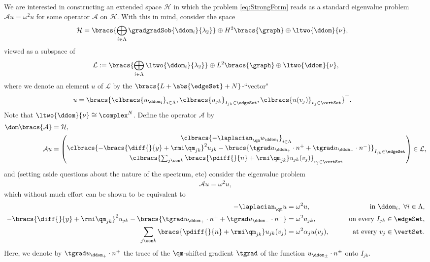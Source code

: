 \documentclass[11pt]{report}
\newcommand{\aop}{\mathcal{A}}
\newcommand{\hcal}{\mathcal{H}}
\newcommand{\lcal}{\mathcal{L}}
\begin{document}
We are interested in constructing an extended space $\hcal$ in which the problem \eqref{eq:StrongForm} reads as a standard eigenvalue problem $\aop u = \omega^2 u$ for some operator $\aop$ on $\hcal$.
With this in mind, consider the space
\begin{align*}
	\hcal &= \bracs{\bigoplus_{i\in\Lambda}\gradgradSob{\ddom_i}{\lambda_2}} \oplus H^2\bracs{\graph} \oplus \ltwo{\ddom}{\nu},
\end{align*}
viewed as a subspace of
\begin{align*}
	\lcal := \bracs{\bigoplus_{i\in\Lambda}\ltwo{\ddom_i}{\lambda_2}} \oplus L^2\bracs{\graph} \oplus \ltwo{\ddom}{\nu},
\end{align*}
where we denote an element $u$ of $\lcal$ by the $\bracs{L+\abs{\edgeSet}+N}$-``vector"
\begin{align*}
	u &= \bracs{\clbracs{u_{\ddom_i}}_{i\in\Lambda}, \clbracs{u_{jk}}_{I_{jk}\in\edgeSet}, \clbracs{u(v_j)}_{v_j\in\vertSet}}^\top.
\end{align*}
Note that $\ltwo{\ddom}{\nu}\cong\complex^N$.
Define the operator $\aop$ by
\begin{align*}
	\dom\bracs{\aop} &= \hcal, \\
	\aop u &= 
	\begin{pmatrix}	
	\clbracs{-\laplacian_{\qm}u_{\ddom_i}}_{i\in\Lambda} \\
	\clbracs{-\bracs{\diff{}{y}+\rmi\qm_{jk}}^2 u_{jk} - \bracs{\tgrad u_{\ddom_+}\cdot n^+ + \tgrad u_{\ddom_-}\cdot n^-} }_{I_{jk}\in\edgeSet} \\
	\clbracs{\sum_{j\con k}\bracs{\pdiff{}{n}+\rmi\qm_{jk}}u_{jk}(v_j)}_{v_j\in\vertSet}
	\end{pmatrix}
	\in\lcal,
\end{align*}
and (setting aside questions about the nature of the spectrum, etc) consider the eigenvalue problem
\begin{align*}
	\aop u = \omega^2 u,
\end{align*}
which without much effort can be shown to be equivalent to
\begin{subequations} \label{eq:aopEvalProb}
	\begin{align}
		-\laplacian_{\qm}u &= \omega^2 u, &\qquad\text{in } \ddom_i, \ \forall i\in\Lambda, \\
		-\bracs{\diff{}{y}+\rmi\qm_{jk}}^2 u_{jk} - \bracs{\tgrad u_{\ddom_+}\cdot n^+ + \tgrad u_{\ddom_-}\cdot n^-} &= \omega^2 u_{jk},  &\qquad\text{on every } I_{jk}\in\edgeSet, \\
		\sum_{j\con k}\bracs{\pdiff{}{n}+\rmi\qm_{jk}}u_{jk}(v_j) &= \omega^2\alpha_j u(v_j), &\qquad\text{at every } v_j\in\vertSet.		
	\end{align}
\end{subequations}
Here, we denote by $\tgrad u_{\ddom_+}\cdot n^+$ the trace of the $\qm$-shifted gradient $\tgrad$ of the function $u_{\ddom_{\pm}}\cdot n^{\pm}$ onto $I_{jk}$.
\end{document}
